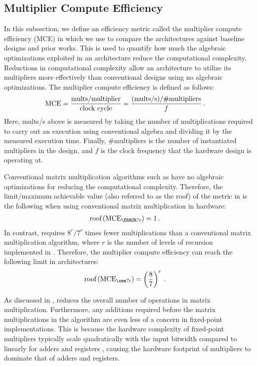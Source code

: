 \subsection{Multiplier Compute Efficiency}
\label{sec:mu}
In this subsection, we define an efficiency metric called the multiplier compute efficiency (MCE) in  which we use to compare the \smmArch architectures against baseline designs and prior works.
This is used to quantify how much the algebraic optimizations exploited in an architecture reduce the computational complexity.
Reductions in computational complexity allow an architecture to utilize its multipliers more effectively than conventional designs using no algebraic optimizations.
The multiplier compute efficiency is defined as follows:
\begin{align}  \label{smm:eq:mu}
  \text{MCE} = \frac{\text{mults} / \text{multiplier}} {\text{clock cycle}}
  &= \frac{(\text{mults/s})/\text{\#multipliers}}{f}
  \,.
\end{align}
Here, mults/s above is measured by taking the number of multiplications required to carry out an execution using conventional algebra and dividing it by the measured execution time.
Finally, \#multipliers is the number of instantiated multipliers in the design, and $f$ is the clock frequency that the hardware design is operating at.

Conventional matrix multiplication algorithms such as  have no algebraic optimizations for reducing the computational complexity.
Therefore, the limit/maximum achievable value (also referred to as the roof) of the metric in  is the following when using conventional matrix multiplication in hardware:
\begin{align}  \label{smm:eq:mm-mu-roof}
  \tx{roof}\lb\tx{MCE}_{\tx{\mm?r}}\rb &= 1
  \,.
\end{align}
In contrast, \sa requires $8^r/7^r$ times fewer multiplications than a conventional matrix multiplication algorithm, where $r$ is the number of levels of recursion implemented in \sa.
Therefore, the multiplier compute efficiency can reach the following limit in \smmArch architectures:
\begin{align} \label{smm:eq:mu-roof}
  \tx{roof}\lb\tx{MCE}_{\tx{\smm?r}}\rb &= 
  \lb\frac{8}{7}\rb^{r}
  \,.
\end{align}

As discussed in , \sa reduces the overall number of operations in matrix multiplication.
Furthermore, any additions required before the matrix multiplications in the algorithm are even less of a concern in fixed-point implementations.
This is because the hardware complexity of fixed-point multipliers typically scale quadratically with the input bitwidth compared to linearly for adders and registers \multComplexity, causing the hardware footprint of multipliers to dominate that of adders and registers.

